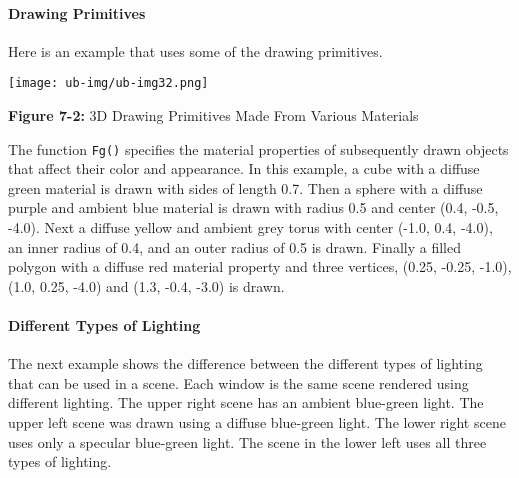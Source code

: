 \paragraph{Drawing Primitives}
Here is an example that uses some of the drawing primitives.


\begin{center}
\texttt{[image: ub-img/ub-img32.png]}

{\sffamily\bfseries Figure 7-2:}
{\sffamily 3D Drawing Primitives Made From Various Materials}
\end{center}

The function \texttt{Fg()} specifies the material properties of
subsequently drawn objects that affect their color and appearance.  In
this example, a cube with a diffuse green material is drawn with sides
of length 0.7. Then a sphere with a diffuse purple and ambient blue
material is drawn with radius 0.5 and center (0.4, -0.5, -4.0). Next a
diffuse yellow and ambient grey torus with center (-1.0, 0.4, -4.0),
an inner radius of 0.4, and an outer radius of 0.5 is drawn. Finally a
filled polygon with a diffuse red material property and three
vertices, (0.25, -0.25, -1.0), (1.0, 0.25, -4.0) and (1.3, -0.4, -3.0)
is drawn.

\paragraph{Different Types of Lighting}

The next example shows the difference between the different types of
lighting that can be used in a scene. Each window is the same scene
rendered using different lighting. The upper right scene has an
ambient blue-green light. The upper left scene was drawn using a
diffuse blue-green light. The lower right scene uses only a specular
blue-green light. The scene in the lower left uses all three types of
lighting.


